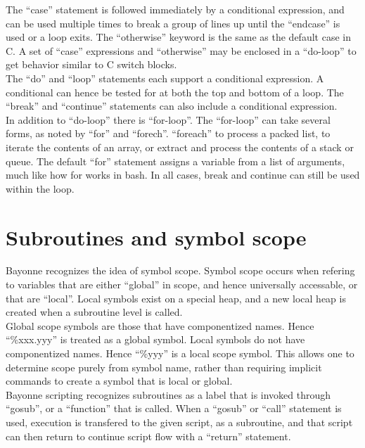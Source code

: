 \documentclass[a4paper,12pt]{article}
\begin{document}
The ``case'' statement is followed immediately by a conditional
expression, and can be used multiple times to break a group of lines up
until the ``endcase'' is used or a loop exits.  The ``otherwise'' keyword 
is the same as the default case in C.  A set of ``case'' expressions and 
``otherwise'' may be enclosed in a ``do-loop'' to get behavior similar to 
C switch blocks. \\

The ``do'' and ``loop'' statements each support a conditional expression.  
A conditional can hence be tested for at both the top and bottom of a 
loop.  The ``break'' and ``continue'' statements can also include a
conditional expression. \\

In addition to ``do-loop'' there is ``for-loop''.  The ``for-loop'' can
take several forms, as noted by ``for'' and ``forech''.  ``foreach'' to
process a packed list, to iterate the contents of an array, or extract
and process the contents of a stack or queue.  The default ``for''
statement assigns a variable from a list of arguments, much like how for
works in bash.  In all cases, break and continue can still be used
within the loop.  \\

\section{Subroutines and symbol scope}

Bayonne recognizes the idea of symbol scope.  Symbol scope occurs when 
refering to variables that are either ``global'' in scope, and hence 
universally accessable, or that are ``local''.  Local symbols exist on a 
special heap, and a new local heap is created when a subroutine level is 
called. \\

Global scope symbols are those that have componentized names.  Hence 
``\%xxx\-.yyy'' is treated as a global symbol.  Local symbols do not have 
componentized names.  Hence ``\%yyy'' is a local scope symbol.  This allows 
one to determine scope purely from symbol name, rather than requiring 
implicit commands to create a symbol that is local or global. \\

Bayonne scripting recognizes subroutines as a label that is invoked
through ``gosub'', or a ``function'' that is called.  When a ``gosub''
or ``call'' statement is used, execution is transfered to the given
script, as a subroutine, and that script can then return to continue
script flow with a ``return'' statement. \\
\end{document}
